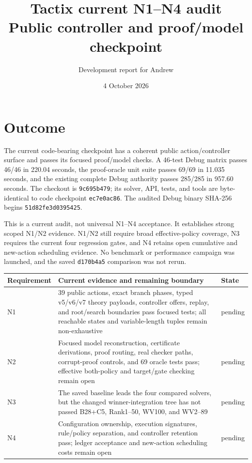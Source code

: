 \documentclass[11pt]{article}
\title{Tactix current N1--N4 audit\\Public controller and proof/model checkpoint}
\author{Development report for Andrew}
\date{4 October 2026}
\newcommand{\code}[1]{\texttt{#1}}
\newcommand{\pending}{\textcolor{orange!70!black}{pending}}
\begin{document}
\maketitle

\section*{Outcome}

The current code-bearing checkpoint has a coherent public action/controller
surface and passes its focused proof/model checks.  A 46-test Debug matrix
passes 46/46 in 220.04 seconds, the proof-oracle unit suite passes 69/69 in
11.035 seconds, and the existing complete Debug authority passes 285/285 in
957.60 seconds.  The checkout is \code{9c695b479}; its solver, API, tests, and
tools are byte-identical to code checkpoint \code{ec7e0ac86}.  The audited
Debug binary SHA-256 begins \code{51d82fe3d0395425}.

This is a current audit, not universal N1--N4 acceptance.  It establishes
strong scoped N1/N2 evidence.  N1/N2 still require broad effective-policy
coverage, N3 requires the current four regression gates, and N4 retains open
cumulative and new-action scheduling evidence.  No benchmark or performance
campaign was launched, and the saved \code{d170b4a5} comparison was not rerun.

\begin{center}
\begin{tabularx}{\textwidth}{@{}lXl@{}}
\toprule
Requirement & Current evidence and remaining boundary & State \\
\midrule
N1 & 39 public actions, exact branch phases, typed v5/v6/v7 theory payloads,
controller offers, replay, and root/search boundaries pass focused tests;
all reachable states and variable-length tuples remain non-exhaustive & \pending \\
N2 & Focused model reconstruction, certificate derivations, proof routing,
real checker paths, corrupt-proof controls, and 69 oracle tests pass;
effective both-policy and target/gate checking remain open & \pending \\
N3 & The saved baseline leads the four compared solvers, but the changed
winner-integration tree has not passed B28+C5, Rank1--50, WV100, and WV2--89 & \pending \\
N4 & Configuration ownership, execution signatures, rule/policy separation,
and controller retention pass; ledger acceptance and new-action scheduling
costs remain open & \pending \\
\bottomrule
\end{tabularx}
\end{center}
\end{document}
